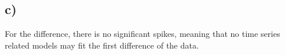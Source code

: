 \documentclass[paper=a4, fontsize=11pt]{scrartcl} %
\numberwithin{equation}{section} %
\numberwithin{figure}{section} %
\numberwithin{table}{section} %
\begin{document}
\subsection*{c)}
For the difference, there is no significant spikes, meaning that no time series related models may fit the first difference of the data.

\end{document}
